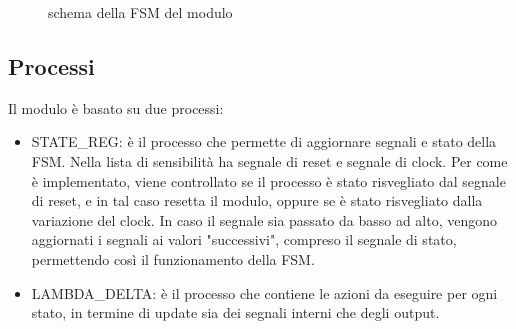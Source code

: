\documentclass{article}
\begin{document}
\begin{figure}[ht]
    \caption{schema della FSM del modulo}
    \label{fig:my_label}
\end{figure}

\subsection{Processi}
Il modulo è basato su due processi:
\begin{itemize}
    \item STATE\_REG: è il processo che permette di aggiornare segnali e stato della FSM. Nella lista di sensibilità ha segnale di reset e segnale di clock. Per come è implementato, viene controllato se il processo è stato risvegliato dal segnale di reset, e in tal caso resetta il modulo, oppure se è stato risvegliato dalla variazione del clock.
    In caso il segnale sia passato da basso ad alto, vengono aggiornati i segnali ai valori "successivi", compreso il segnale di stato, permettendo così il funzionamento della FSM.
    \item LAMBDA\_DELTA: è il processo che contiene le azioni da eseguire per ogni stato, in termine di update sia dei segnali interni che degli output.
\end{itemize}
\end{document}
